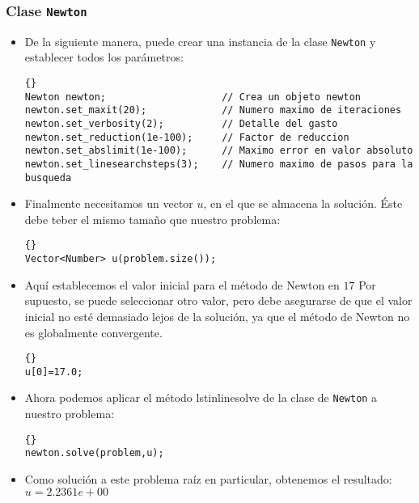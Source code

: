 \documentclass[a4paper,11pt]{article}
\theoremstyle{definition}
\begin{document}
\subsubsection{Clase \lstinline{Newton}}
\begin{itemize}
\item De la siguiente manera, puede crear una instancia de la clase \lstinline{Newton} y establecer todos los parámetros:

    {\footnotesize{\begin{lstlisting}{}
Newton newton;                    // Crea un objeto newton
newton.set_maxit(20);             // Numero maximo de iteraciones 
newton.set_verbosity(2);          // Detalle del gasto
newton.set_reduction(1e-100);     // Factor de reduccion
newton.set_abslimit(1e-100);      // Maximo error en valor absoluto
newton.set_linesearchsteps(3);    // Numero maximo de pasos para la busqueda
\end{lstlisting}}}

\item Finalmente necesitamos un vector $u$, en el que se almacena la solución. 
Éste debe teber el mismo tamaño que nuestro problema:

  {\footnotesize{\begin{lstlisting}{}
Vector<Number> u(problem.size());
\end{lstlisting}}}

\item Aquí establecemos el valor inicial para el método de Newton en $17$ Por supuesto, se puede seleccionar otro valor, pero debe asegurarse de que el valor inicial no esté demasiado lejos de la solución, ya que el método de Newton no es globalmente convergente.
  {\footnotesize{\begin{lstlisting}{}
u[0]=17.0;
\end{lstlisting}}}

\item Ahora podemos aplicar el método lstinline{solve} de la clase de \lstinline{Newton} a nuestro problema:

  {\footnotesize{\begin{lstlisting}{}
newton.solve(problem,u);
\end{lstlisting}}}

\item Como solución a este problema raíz en particular, obtenemos el resultado:\\
  $u= 2.2361e+00$
\end{itemize}
\end{document}
